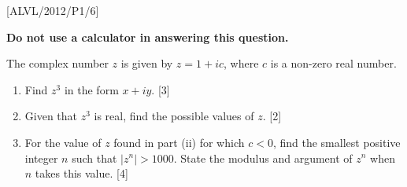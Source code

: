 \item {[}ALVL/2012/P1/6{]}

\textbf{Do not use a calculator in answering this question.}

The complex number $z$ is given by $z=1+ic$, where $c$ is a non-zero
real number.
\begin{enumerate}
\item Find $z^{3}$ in the form $x+iy$. \hfill{} {[}3{]}
\item Given that $z^{3}$ is real, find the possible values of $z$. \hfill{}
{[}2{]}
\item For the value of $z$ found in part (ii) for which $c<0$, find the
smallest positive integer $n$ such that $\left|z^{n}\right|>1000$.
State the modulus and argument of $z^{n}$ when $n$ takes this value.
\hfill{}{[}4{]}
\end{enumerate}
